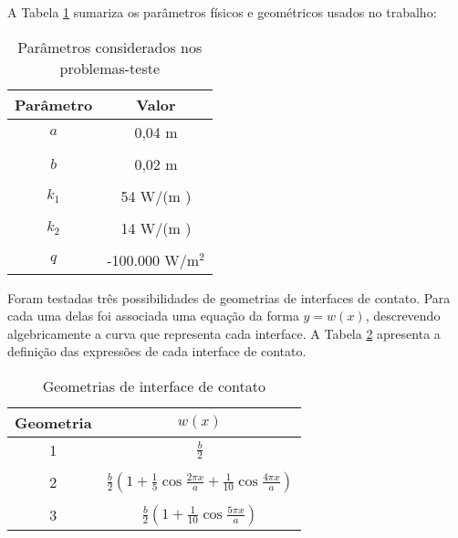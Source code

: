 A Tabela \ref{tabela_params} sumariza os parâmetros físicos e geométricos usados no trabalho:
\begin{table}[h!b]
\begin{center}
	\begin{tabular}{@{}cc@{}}
		\toprule
		\textbf{Parâmetro} & \textbf{Valor}    \\ \midrule
		$a$       & 0,04 m   \\ \\
		$b$       & 0,02 m     \\ \\
		$k_1$     & 54 W/(m \celsius)  \\ \\ 
		$k_2$     & 14 W/(m \celsius) \\ \\
		$q$       & -100.000 W/$\text{m}^2$ \\ \bottomrule
	\end{tabular}		
\end{center}
\caption{Parâmetros considerados nos problemas-teste}
\label{tabela_params}
\end{table}

Foram testadas três possibilidades de geometrias de interfaces de contato. Para cada uma delas foi associada uma equação da forma $y = w(x)$, descrevendo algebricamente a curva que representa cada interface. A Tabela \ref{tabela_interfaces} apresenta a definição das expressões de cada interface de contato.
\begin{table}[h!b]
	\begin{center}
		\begin{tabular}{@{}cc@{}}
			\toprule
			\textbf{Geometria} & $w(x)$    \\ \midrule
			1       & $\displaystyle\frac{b}{2}$   \\ \\
			2     & $\displaystyle\frac{b}{2}\left(1 + \frac{1}{5} \cos\frac{2\pi x}{a} + \frac{1}{10}\cos\frac{4\pi x}{a}\right)$     \\ \\
			3       & $\displaystyle \frac{b}{2}\left(1 + \frac{1}{10} \cos\frac{5 \pi  x}{a}\right)$ \\ \bottomrule
		\end{tabular}		
	\end{center}
	\caption{Geometrias de interface de contato}
	\label{tabela_interfaces}
\end{table}
\newpage

